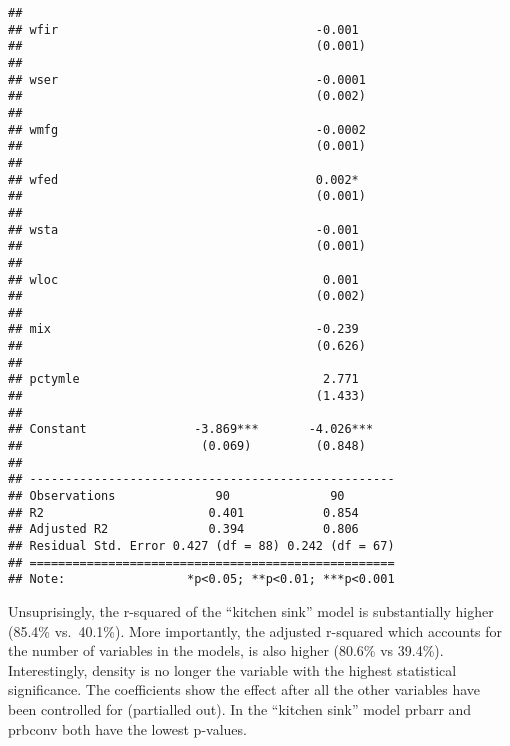\documentclass[
]{article}
\begin{document}
\begin{verbatim}
##                                                    
## wfir                                    -0.001     
##                                         (0.001)    
##                                                    
## wser                                    -0.0001    
##                                         (0.002)    
##                                                    
## wmfg                                    -0.0002    
##                                         (0.001)    
##                                                    
## wfed                                    0.002*     
##                                         (0.001)    
##                                                    
## wsta                                    -0.001     
##                                         (0.001)    
##                                                    
## wloc                                     0.001     
##                                         (0.002)    
##                                                    
## mix                                     -0.239     
##                                         (0.626)    
##                                                    
## pctymle                                  2.771     
##                                         (1.433)    
##                                                    
## Constant               -3.869***       -4.026***   
##                         (0.069)         (0.848)    
##                                                    
## ---------------------------------------------------
## Observations              90              90       
## R2                       0.401           0.854     
## Adjusted R2              0.394           0.806     
## Residual Std. Error 0.427 (df = 88) 0.242 (df = 67)
## ===================================================
## Note:                 *p<0.05; **p<0.01; ***p<0.001
\end{verbatim}

Unsuprisingly, the r-squared of the ``kitchen sink'' model is
substantially higher (85.4\% vs.~40.1\%). More importantly, the adjusted
r-squared which accounts for the number of variables in the models, is
also higher (80.6\% vs 39.4\%). Interestingly, density is no longer the
variable with the highest statistical significance. The coefficients
show the effect after all the other variables have been controlled for
(partialled out). In the ``kitchen sink'' model prbarr and prbconv both
have the lowest p-values.\\
\end{document}
